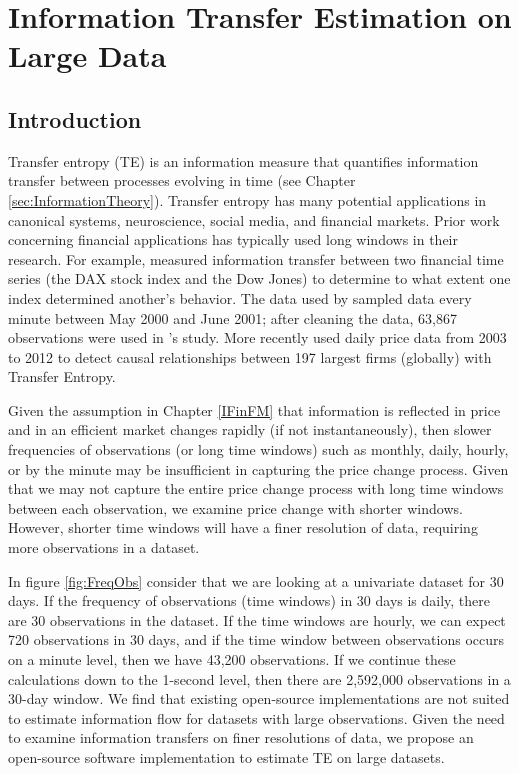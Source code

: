 \chapter{ Information Transfer Estimation on Large Data} \label{Chapter:PyIF}

\section{Introduction}

Transfer entropy (TE) is an information measure that quantifies information transfer between processes evolving in time (see Chapter \ref{sec:InformationTheory}). Transfer entropy has many potential applications in canonical systems, neuroscience, social media, and financial markets. Prior work concerning financial applications has typically used long windows in their research. For example, \cite{Kantz} measured information transfer between two financial time series (the DAX stock index and the Dow Jones) to determine to what extent one index determined another's behavior. The data used by \cite{Kantz} sampled data every minute between May 2000 and June 2001; after cleaning the data, 63,867 observations were used in \cite{Kantz}'s study.  More recently \cite{Sandoval} used daily price data from 2003 to 2012 to detect causal relationships between 197 largest firms (globally) with Transfer Entropy.

Given the assumption in Chapter \ref{IFinFM} that information is reflected in price and in an efficient market changes rapidly (if not instantaneously), then slower frequencies of observations (or long time windows) such as monthly, daily, hourly, or by the minute may be insufficient in capturing the price change process.  Given that we may not capture the entire price change process with long time windows between each observation, we examine price change with shorter windows.  However, shorter time windows will have a finer resolution of data, requiring more observations in a dataset. 

In figure \ref{fig:FreqObs} consider that we are looking at a univariate dataset for 30 days.  If the frequency of observations (time windows) in 30 days is daily,  there are 30 observations in the dataset.  If the time windows are hourly, we can expect 720 observations in 30 days, and if the time window between observations occurs on a minute level, then we have 43,200 observations.  If we continue these calculations down to the 1-second level, then there are 2,592,000 observations in a 30-day window.  We find that existing open-source implementations are not suited to estimate information flow for datasets with large observations.  Given the need to examine information transfers on finer resolutions of data, we propose an open-source software implementation to estimate TE on large datasets.

